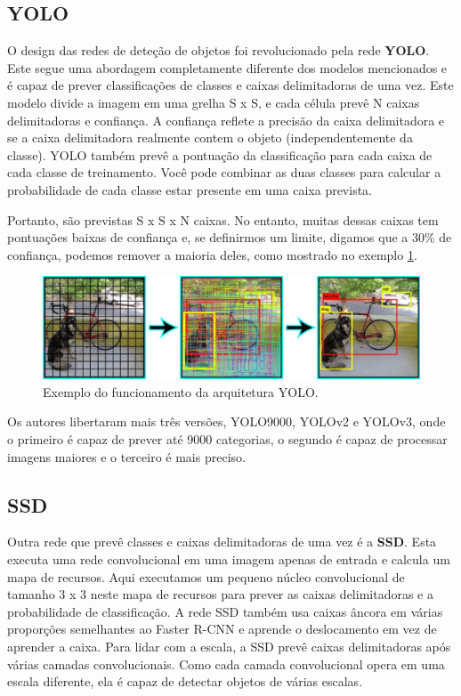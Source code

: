 \subsection{YOLO}
\label{chap2:subsec:yolo}

O design das redes de deteção de objetos foi revolucionado pela rede \textbf{\ac{YOLO}}. Este segue uma abordagem completamente diferente dos modelos mencionados e é capaz de prever classificações de classes e caixas delimitadoras de uma vez.
\newline Este modelo divide a imagem em uma grelha S x S, e cada célula prevê N caixas delimitadoras e confiança. A confiança reflete a precisão da caixa delimitadora e se a caixa delimitadora realmente contem o objeto (independentemente da classe). \ac{YOLO} também prevê a pontuação da classificação para cada caixa de cada classe de treinamento. Você pode combinar as duas classes para calcular a probabilidade de cada classe estar presente em uma caixa prevista.

Portanto, são previstas S x S x N caixas. No entanto, muitas dessas caixas tem pontuações baixas de confiança e, se definirmos um limite, digamos que a 30\% de confiança, podemos remover a maioria deles, como mostrado no exemplo \ref{img:yolo}.

\begin{figure}[h!]
  \label{img:yolo}
  \includegraphics[width=1\textwidth]{yolo.jpg}
  \caption{Exemplo do funcionamento da arquitetura \ac{YOLO}.}
\end{figure}

Os autores libertaram mais três versões, YOLO9000, YOLOv2 e YOLOv3, onde o primeiro é capaz de prever até 9000 categorias, o segundo é capaz de processar imagens maiores e o terceiro é mais preciso. 

\subsection{SSD}
\label{chap2:subsec:ssd}

Outra rede que prevê classes e caixas delimitadoras de uma vez é a \textbf{\ac{SSD}}. Esta executa uma rede convolucional em uma imagem apenas de entrada e calcula um mapa de recursos. Aqui executamos um pequeno núcleo convolucional de tamanho 3 x 3 neste mapa de recursos para prever as caixas delimitadoras e a probabilidade de classificação.
\newline A rede \ac{SSD} também usa caixas âncora em várias proporções semelhantes ao Faster \ac{R-CNN} e aprende o deslocamento em vez de aprender a caixa. Para lidar com a escala, a \ac{SSD} prevê caixas delimitadoras após várias camadas convolucionais. Como cada camada convolucional opera em uma escala diferente, ela é capaz de detectar objetos de várias escalas.

